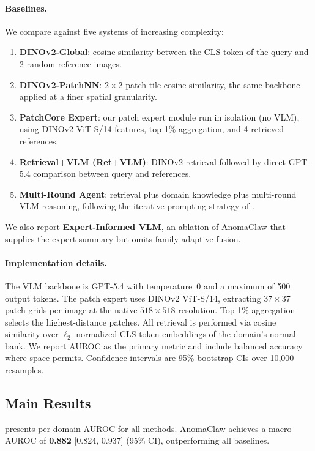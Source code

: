 \paragraph{Baselines.}
We compare against five systems of increasing complexity:
\begin{enumerate}[leftmargin=*,itemsep=2pt]
    \item \textbf{DINOv2-Global}: cosine similarity between the CLS token of the query and 2 random reference images.
    \item \textbf{DINOv2-PatchNN}: $2{\times}2$ patch-tile cosine similarity, the same backbone applied at a finer spatial granularity.
    \item \textbf{PatchCore Expert}: our patch expert module run in isolation (no VLM), using DINOv2 ViT-S/14 features, top-1\% aggregation, and 4 retrieved references.
    \item \textbf{Retrieval+VLM (Ret+VLM)}: DINOv2 retrieval followed by direct GPT-5.4 comparison between query and references.
    \item \textbf{Multi-Round Agent}: retrieval plus domain knowledge plus multi-round VLM reasoning, following the iterative prompting strategy of \citet{zhang2025agentiad}.
\end{enumerate}
We also report \textbf{Expert-Informed VLM}, an ablation of AnomaClaw that supplies the expert summary but omits family-adaptive fusion.

\paragraph{Implementation details.}
The VLM backbone is GPT-5.4 with temperature~0 and a maximum of 500 output tokens.
The patch expert uses DINOv2 ViT-S/14, extracting $37{\times}37$ patch grids per image at the native $518{\times}518$ resolution.
Top-1\% aggregation selects the highest-distance patches.
All retrieval is performed via cosine similarity over $\ell_2$-normalized CLS-token embeddings of the domain's normal bank.
We report AUROC as the primary metric and include balanced accuracy where space permits.
Confidence intervals are 95\% bootstrap CIs over 10{,}000 resamples.


\subsection{Main Results}
\label{sec:main_results}

 presents per-domain AUROC for all methods.
AnomaClaw achieves a macro AUROC of \textbf{0.882} [0.824, 0.937] (95\% CI), outperforming all baselines.

